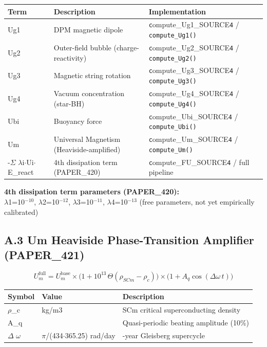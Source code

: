 \documentclass[12pt,a4paper]{article}
\begin{document}
\begin{table}[H]
\centering
\small
\begin{tabularx}{\linewidth}{@{}>{\raggedright\arraybackslash}X>{\raggedright\arraybackslash}X>{\raggedright\arraybackslash}X@{}}
\toprule
Term & Description & Implementation \tabularnewline
\midrule
Ug1 & DPM magnetic dipole & \texttt{c}ompute\_{Ug1\_SOURCE}\texttt{4} / \texttt{compute\_Ug1()} \tabularnewline
Ug2 & Outer-field bubble (charge-reactivity) & \texttt{c}ompute\_{Ug2\_SOURCE}\texttt{4} / \texttt{compute\_Ug2()} \tabularnewline
Ug3 & Magnetic string rotation & \texttt{c}ompute\_{Ug3\_SOURCE}\texttt{4} / \texttt{compute\_Ug3()} \tabularnewline
Ug4 & Vacuum concentration (star-BH) & \texttt{c}ompute\_{Ug4\_SOURCE}\texttt{4} / \texttt{compute\_Ug4()} \tabularnewline
Ubi & Buoyancy force & \texttt{c}ompute\_{Ubi\_SOURCE}\texttt{4} / \texttt{compute\_Ubi()} \tabularnewline
Um & Universal Magnetism (Heaviside-amplified) & \texttt{c}ompute\_{Um\_SOURCE}\texttt{4} / \texttt{compute\_Um()} \tabularnewline
-$\Sigma$ $\lambda$i$\cdot$Ui$\cdot$E\_react & 4th dissipation term (PAPER\_420) & \texttt{c}ompute\_{FU\_SOURCE}\texttt{4} / full pipeline \tabularnewline
\bottomrule
\end{tabularx}
\end{table}

\textbf{4th dissipation term parameters (PAPER\_420):} \\  $\lambda$1=10$^{-10}$, $\lambda$2=10$^{-12}$, $\lambda$3=10$^{-11}$, $\lambda$4=10$^{-13}$ (free parameters, not yet empirically calibrated)

\subsection{A.3 Um Heaviside Phase-Transition Amplifier (PAPER\_421)}

\begin{equation}
U_m^{\mathrm{full}} = U_m^{\mathrm{base}} \times \bigl(1 + 10^{13}\,\Theta(\rho_{SCm} - \rho_c)\bigr) \times \bigl(1 + A_q\cos(\Delta\omega\,t)\bigr)
\end{equation}

\begin{table}[H]
\centering
\small
\begin{tabularx}{\linewidth}{@{}>{\raggedright\arraybackslash}X>{\raggedright\arraybackslash}X>{\raggedright\arraybackslash}X@{}}
\toprule
Symbol & Value & Description \tabularnewline
\midrule
$\rho$\_c & 1015 kg/m3 & SCm critical superconducting density \tabularnewline
A\_q & 0.1 & Quasi-periodic beating amplitude (10\%) \tabularnewline
$\Delta$ $\omega$ & 2$\pi$/(434$\cdot$365.25) rad/day & 434-year Gleisberg supercycle \tabularnewline
\bottomrule
\end{tabularx}
\end{table}
\end{document}
